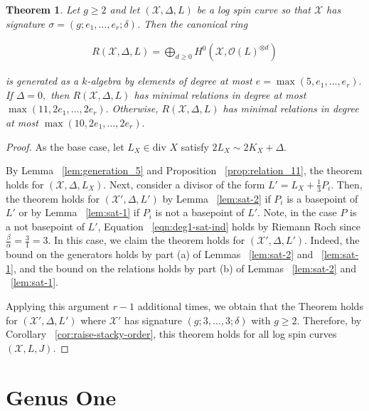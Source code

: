 \documentclass{amsart}
\theoremstyle{plain}
\newtheorem{thm}{Theorem}[section]
\theoremstyle{definition}
\theoremstyle{remark}
\numberwithin{equation}{section}
\newcommand \sx{\mathscr X}
\newcommand\sco{{\mathscr O}}
\newcommand \di{\text{div }}
\newcommand \halfcan{L}
\begin{document}
\begin{thm}
\label{thm:g-high-main}
Let $g \geq 2$ and let $(\sx, \Delta, \halfcan)$ be a log spin curve so
that $\sx$ has signature $\sigma = (g; e_1, \ldots, e_r; \delta)$. Then the
canonical ring

\begin{align*}
	R(\sx, \Delta, \halfcan) = \bigoplus_{d \geq 0} H^0(\sx, \sco(L)^{\otimes d})
\end{align*}

\noindent
is generated as a $k$-algebra by elements of degree at most $e =
\max(5, e_1, \ldots, e_r).$ If $\Delta = 0,$ then 
$R(\sx,\Delta, \halfcan)$ has minimal relations in degree at most $\max(11, 2e_1,
\ldots, 2e_r).$ Otherwise, $R(\sx, \Delta, \halfcan)$ has minimal relations in degree at most
$\max(10, 2e_1, \ldots, 2e_r).$
\end{thm}

\begin{proof}
As the base case, let $\halfcan_X \in \di X$ satisfy $2\halfcan_X \sim 2 K_X + \Delta$.

By Lemma ~\ref{lem:generation_5} and Proposition
~\ref{prop:relation_11}, the theorem holds for $(\sx, \Delta,
\halfcan_X)$. Next, consider a divisor of the form $\halfcan' =
\halfcan_X + \frac{1}{3} P_i$. Then, the theorem holds for $(\sx',
\Delta, \halfcan')$ by Lemma ~\ref{lem:sat-2}
 if $P_i$ is a basepoint of $\halfcan'$ or by Lemma
~\ref{lem:sat-1} if $P_i $ is not a basepoint of $L'$. Note,
in the case $P$  is a not basepoint of $\halfcan'$, Equation
~\ref{eqn:deg1-sat-ind} holds by Riemann Roch since $\frac{\beta}{\alpha} = \frac{3}{1}=3$. In this case, we claim the theorem holds for $(\sx',\Delta, L')$. Indeed, the bound on the generators holds by part (a) of Lemmas
~\ref{lem:sat-2} and ~\ref{lem:sat-1},
and the bound on the relations holds by part (b) of Lemmas
~\ref{lem:sat-2} and ~\ref{lem:sat-1}.

Applying this argument $r-1$ additional times, we obtain that the Theorem holds for $(\sx', \Delta, \halfcan')$ where $\sx'$ has signature $(g;3,\ldots, 3;\delta)$ with $g \geq 2$. Therefore, by Corollary 
~\ref{cor:raise-stacky-order}, this theorem 
holds for all log spin curves $(\sx, L, J)$. 
\end{proof}


\section{Genus One}
\label{sec:g_1}
\end{document}
